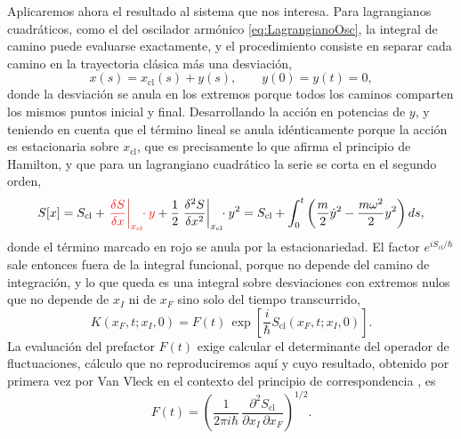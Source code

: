         Aplicaremos ahora el resultado al sistema que nos interesa. Para lagrangianos cuadráticos, como el del oscilador armónico \eqref{eq:LagrangianoOsc}, la integral de camino puede evaluarse exactamente, y el procedimiento consiste en separar cada camino en la trayectoria clásica más una desviación,
        \begin{equation}\label{eq:SeparacionCaminos}
            x(s) = x_{\mathrm{cl}}(s) + y(s), \qquad y(0) = y(t) = 0,
        \end{equation}
        donde la desviación se anula en los extremos porque todos los caminos comparten los mismos puntos inicial y final. Desarrollando la acción en potencias de $y$, y teniendo en cuenta que el término lineal se anula idénticamente porque la acción es estacionaria sobre $x_{\mathrm{cl}}$, que es precisamente lo que afirma el principio de Hamilton, y que para un lagrangiano cuadrático la serie se corta en el segundo orden,
        \begin{equation}\label{eq:AccionSeparada}
            S[x] = S_{\mathrm{cl}} + \textcolor{red}{\left.\frac{\delta S}{\delta x}\right|_{x_{\mathrm{cl}}}\!\!\cdot y} + \frac{1}{2}\left.\frac{\delta^{2}S}{\delta x^{2}}\right|_{x_{\mathrm{cl}}}\!\!\cdot y^{2}
            = S_{\mathrm{cl}} + \int_{0}^{t}\left(\frac{m}{2}\dot{y}^{2} - \frac{m\omega^{2}}{2}y^{2}\right)ds,
        \end{equation}
        donde el término marcado en rojo se anula por la estacionariedad. El factor $e^{iS_{\mathrm{cl}}/\hbar}$ sale entonces fuera de la integral funcional, porque no depende del camino de integración, y lo que queda es una integral sobre desviaciones con extremos nulos que no depende de $x_{I}$ ni de $x_{F}$ sino solo del tiempo transcurrido,
        \begin{equation}\label{eq:PropagadorFactorizado}
            K(x_{F},t;x_{I},0) = F(t)\,\exp\left[\frac{i}{\hbar}S_{\mathrm{cl}}(x_{F},t;x_{I},0)\right] .
        \end{equation}
        La evaluación del prefactor $F(t)$ exige calcular el determinante del operador de fluctuaciones, cálculo que no reproduciremos aquí y cuyo resultado, obtenido por primera vez por Van Vleck en el contexto del principio de correspondencia \citep{vanvleck1928correspondence}, es
        \begin{equation}\label{eq:VanVleck}
            F(t) = \left(\frac{1}{2\pi i\hbar}\,\frac{\partial^{2}S_{\mathrm{cl}}}{\partial x_{I}\,\partial x_{F}}\right)^{1/2} .
        \end{equation}

